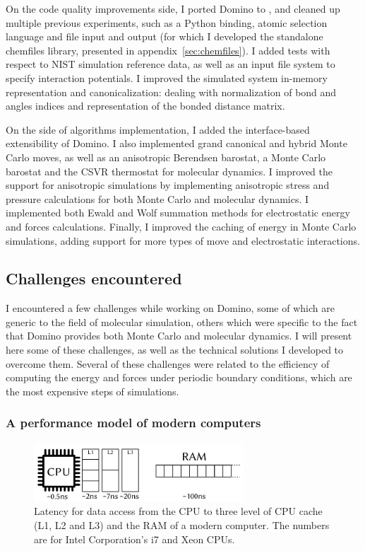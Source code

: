 \documentclass[thesis]{subfiles}
\begin{document}
On the code quality improvements side, I ported Domino to , and cleaned up
multiple previous experiments, such as a Python binding, atomic selection
language and file input and output (for which I developed the standalone
chemfiles library, presented in appendix~\ref{sec:chemfiles}). I added tests
with respect to NIST simulation reference data\cite{NIST}, as well as an input
file system to specify interaction potentials. I improved the simulated system
in-memory representation and canonicalization: dealing with normalization of
bond and angles indices and representation of the bonded distance matrix.

On the side of algorithms implementation, I added the interface-based
extensibility of Domino. I also implemented grand canonical and hybrid Monte
Carlo moves, as well as an anisotropic Berendsen barostat, a Monte Carlo
barostat and the CSVR thermostat for molecular dynamics. I improved the support
for anisotropic simulations by implementing anisotropic stress and pressure
calculations for both Monte Carlo and molecular dynamics. I implemented both
Ewald and Wolf summation methods for electrostatic energy and forces
calculations. Finally, I improved the caching of energy in Monte Carlo
simulations, adding support for more types of move and electrostatic
interactions.

\subsection{Challenges encountered}

I encountered a few challenges while working on Domino, some of which are
generic to the field of molecular simulation, others which were specific to the
fact that Domino provides both Monte Carlo and molecular dynamics. I will
present here some of these challenges, as well as the technical solutions I
developed to overcome them. Several of these challenges were related to the
efficiency of computing the energy and forces under periodic boundary
conditions, which are the most expensive steps of simulations.

\subsubsection{A performance model of modern computers}
\label{sec:computer-model}

\begin{figure}[b]
    \centering
    \includegraphics[width=0.7\textwidth]{figures/images/computer-model}
    \caption{Latency for data access from the CPU to three level of CPU cache
    (L1, L2 and L3) and the RAM of a modern computer. The numbers are for Intel
    Corporation's i7 and Xeon CPUs\cite{SO-CPU-latency}.}
    \label{fig:computer-model}
\end{figure}
\end{document}
